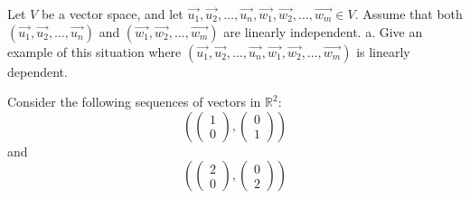 \documentclass[12pt]{article}
\newenvironment{problem}[2][Problem]
{
	\begin{trivlist} 
		\item[\hskip \labelsep {\bfseries #1 #2:}]
	}
{
	\end{trivlist}
	}
\newenvironment{solution}[1][Solution]
{
	\begin{trivlist} 
		\item[\hskip \labelsep {\itshape #1:}]
	}
	{
	\end{trivlist}
}
\begin{document}
\newpage
\begin{problem}{3}
Let $V$ be a vector space, and let $\vec{u_1},\vec{u_2}, \dots , \vec{u_n},\vec{w_1},\vec{w_2}, \dots , \vec{w_m} \in V$. Assume that both $(\vec{u_1},\vec{u_2}, \dots , \vec{u_n})$ and $(\vec{w_1},\vec{w_2}, \dots , \vec{w_m})$ are linearly independent.
\noindent
\newline
\newline
a. Give an example of this situation where $(\vec{u_1},\vec{u_2}, \dots , \vec{u_n},\vec{w_1},\vec{w_2}, \dots , \vec{w_m})$ is linearly dependent.
\begin{solution} Consider the following sequences of vectors in $\mathbb{R}^2$:
\[
\left( \begin{pmatrix}1\\0\end{pmatrix}, \begin{pmatrix} 0\\1 \end{pmatrix} \right)
\]
and
\[
\left( \begin{pmatrix}2\\0\end{pmatrix}, \begin{pmatrix} 0\\2 \end{pmatrix} \right)
\]

\end{solution}
\end{problem}
\end{document}
